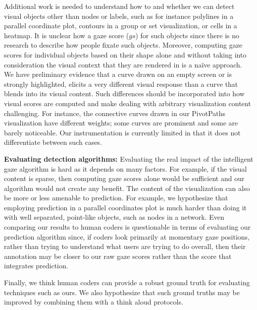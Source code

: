 Additional work is needed to understand how to and whether we can detect visual objects other than nodes or labels, such as for instance polylines in a parallel coordinate plot, contours in a group or set visualization, or cells in a heatmap. It is unclear how a gaze score ($gs$) for such objects since there is no research to describe how people fixate such objects. Moreover, computing gaze scores for individual objects based on their shape alone and without taking into consideration the visual context that they are rendered in is a naïve approach. We have preliminary evidence that a curve drawn on an empty screen or is strongly highlighted, elicits a very different visual response than a curve that blends into its visual content. Such differences should be incorporated into how visual scores are computed and make dealing with arbitrary visualization content challenging. For instance, the connective curves drawn in our PivotPaths visualization have different weights; some curves are prominent and some are barely noticeable. Our instrumentation is currently limited in that it does not differentiate between such cases.

\textbf{Evaluating detection algorithms:} Evaluating the real impact of the intelligent gaze algorithm is hard as it depends on many factors. For example, if the visual content is sparse, then computing gaze scores alone would be sufficient and our algorithm would not create any benefit. The content of the visualization can also be more or less amenable to prediction. For example, we hypothesize that employing prediction in a parallel coordinates plot is much harder than doing it with well separated, point-like objects, such as nodes in a network. Even comparing our results to human coders is questionable in terms of evaluating our prediction algorithm since, if coders look primarily at momentary gaze positions, rather than trying to understand what users are trying to do overall, then their annotation may be closer to our raw gaze scores rather than the score that integrates prediction. 

Finally, we think human coders can provide a robust ground truth for evaluating techniques such as ours. We also hypothesize that such ground truths may be improved by combining them with a think aloud protocols. 